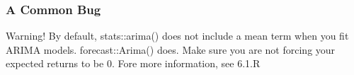 \documentclass{beamer}
\begin{document}

\begin{frame}
\frametitle{A Common Bug}

\begin{block}{Warning!}
By default, stats::arima() does not include a mean term when you fit ARIMA models. forecast::Arima() does. Make sure you are not forcing your expected returns to be $0$. Fore more information, see 6.1.R
\end{block}


\end{frame}
\end{document}
